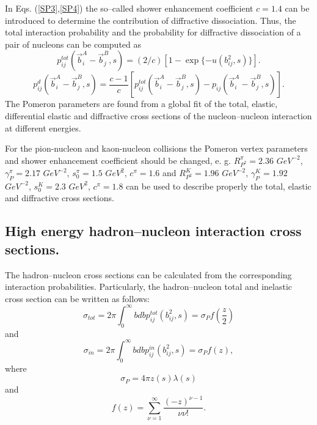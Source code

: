 In Eqs. (\ref{SP3},\ref{SP4}) the so--called shower enhancement
coefficient $c=1.4$ can be introduced to determine the contribution of
diffractive dissociation\cite{BT76}.  Thus, the total interaction
probability and the probability for diffractive dissociation of a pair
of nucleons can be computed as
\begin{equation}
\label{SP8}p_{ij}^{tot}(\vec b_i^A-\vec b_j^B,s)=(2/c)[1-\exp
\{-u(b_{ij}^2,s)\}]. 
\end{equation}
\begin{equation}
\label{SP9}p_{ij}^d(\vec b_i^A-\vec b_j^B,s)=\frac{c-1}{c}[p_{ij}^{tot}(\vec
b_i^A-\vec b_j^B,s)-p_{ij}(\vec b_i^A-\vec b_j^B,s)]. 
\end{equation}
The Pomeron parameters are found from a global fit of the total,
elastic, differential elastic and diffractive cross sections of the
nucleon--nucleon interaction at different energies.

For the pion-nucleon and kaon-nucleon collisions the Pomeron vertex
parameters and shower enhancement coefficient should be changed, e. g.
$R^{\pi}_{P^2} = 2.36$ $GeV^{-2}$, $\gamma^{\pi}_P = 2.17$ $GeV^{-2}$,
$s^{\pi}_{0} = 1.5$ $GeV^{2}$, $c^{\pi}=1.6$ and $R^{K}_{P^2} = 1.96$
$GeV^{-2}$, $\gamma^{K} _P = 1.92$ $GeV^{-2}$, $s^{K}_{0} = 2.3$
$GeV^{2}$, $c^{\pi}=1.8$ can be used to describe properly the total,
elastic and diffractive cross sections.

\subsection{High energy hadron--nucleon interaction cross sections.}

\hspace{1.0em}The hadron--nucleon  cross sections can be calculated from
the corresponding interaction probabilities. Particularly, the
hadron--nucleon total and inelastic cross section can be written as
follows:
\begin{equation}
\label{SP10}\sigma_{tot} = 2\pi \int_0^{\infty}bdbp_{ij}^{tot}(b^2_{ij},s) 
= \sigma_{P} f(\frac{z}{2})
\end{equation}
and
\begin{equation}
\label{SP11}\sigma_{in} = 2\pi \int_0^{\infty}bdbp_{ij}^{in}(b^2_{ij},s) 
= \sigma_{P} f(z),
\end{equation}
where
\begin{equation}
\label{SP12}\sigma_{P}=4\pi z(s)\lambda(s)
\end{equation}
and
\begin{equation}
\label{SP13} f(z)= \sum_{\nu = 1}^{\infty}\frac{(-z)^{\nu -1}}{\nu \nu !}.
\end{equation}


